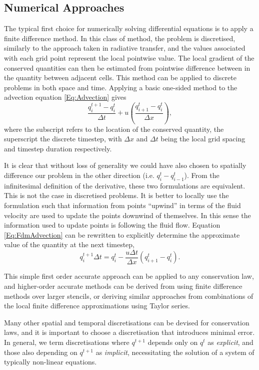 \subsection{Numerical Approaches}

The typical first choice for numerically solving differential equations is to apply a finite difference method.
In this class of method, the problem is discretised, similarly to the approach taken in radiative transfer, and the values associated with each grid point represent the local pointwise value.
The local gradient of the conserved quantities can then be estimated from pointwise difference between in the quantity between adjacent cells.
This method can be applied to discrete problems in both space and time.
Applying a basic one-sided method to the advection equation \eqref{Eq:Advection} gives
\begin{equation}\label{Eq:FdmAdvection}
    \frac{q^{t+1}_i - q^t_i}{\Delta t} + u\left( \frac{q^t_{i+1} - q^t_i}{\Delta x} \right),
\end{equation}
where the subscript refers to the location of the conserved quantity, the superscript the discrete timestep, with $\Delta x$ and $\Delta t$ being the local grid spacing and timestep duration respectively.

It is clear that without loss of generality we could have also chosen to spatially difference our problem in the other direction (i.e. $q^t_i - q^t_{i-1}$).
From the infinitesimal definition of the derivative, these two formulations are equivalent.
This is not the case in discretised problems.
It is better to locally use the formulation such that information from points ``upwind'' in terms of the fluid velocity are used to update the points downwind of themselves.
In this sense the information used to update points is following the fluid flow.
Equation \eqref{Eq:FdmAdvection} can be rewritten to explicitly determine the approximate value of the quantity at the next timestep,
\begin{equation}
    q^{t+1}_i {\Delta t} = q^t_i - \frac{u \Delta t}{\Delta x}\left( q^t_{i+1} - q^t_i \right).
\end{equation}

This simple first order accurate approach can be applied to any conservation law, and higher-order accurate methods can be derived from using finite difference methods over larger stencils, or deriving similar approaches from combinations of the local finite difference approximations using Taylor series.

Many other spatial and temporal discretisations can be devised for conservation laws, and it is important to choose a discretisation that introduces minimal error.
In general, we term discretisations where $q^{t+1}$ depends only on $q^{t}$ as \emph{explicit}, and those also depending on $q^{t+1}$ as \emph{implicit}, necessitating the solution of a system of typically non-linear equations.

